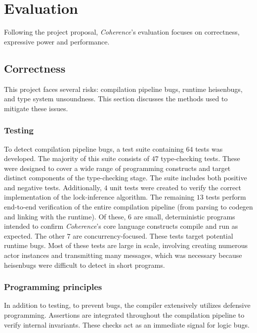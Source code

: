 \chapter{Evaluation}
Following the project proposal, \textit{Coherence}'s evaluation focuses on correctness, expressive power and performance.

\section{Correctness}
This project faces several risks: compilation pipeline bugs, runtime heisenbugs, and type system unsoundness. This section discusses the methods used to mitigate these issues.

\subsection{Testing}
To detect compilation pipeline bugs, a test suite containing $64$ tests was developed. The majority of this suite consists of $47$ type-checking tests. These were designed to cover a wide range of programming constructs and target distinct components of the type-checking stage. The suite includes both positive and negative tests. Additionally, $4$ unit tests were created to verify the correct implementation of the lock-inference algorithm. The remaining $13$ tests perform end-to-end verification of the entire compilation pipeline (from parsing to codegen and linking with the runtime). Of these, $6$ are small, deterministic programs intended to confirm \textit{Coherence}'s core language constructs compile and run as expected. The other $7$ are concurrency-focused. These tests target potential runtime bugs. Most of these tests are large in scale, involving creating numerous actor instances and transmitting many messages, which was necessary because heisenbugs were difficult to detect in short programs.

\subsection{Programming principles}
In addition to testing, to prevent bugs, the compiler extensively utilizes defensive programming. Assertions are integrated throughout the compilation pipeline to verify internal invariants. These checks act as an immediate signal for logic bugs.

